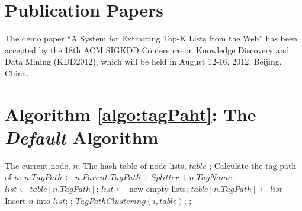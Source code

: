 \appendix{}
\chapter{Publication Papers}
The demo paper\cite{ZZX2012KDD} ``A System for Extracting Top-K Lists from the Web'' has been accepted by 
the 18th ACM SIGKDD Conference on Knowledge Discovery and Data Mining (KDD2012), which will be held in 
August 12-16, 2012, Beijing, China.


\chapter{Algorithm \ref{algo:tagPaht}: The {\em Default} Algorithm}
\label{appendix:algo}


\begin{algorithm}
\caption{$TagPathClustering(n,table)$}
\label{algo:tagPaht}
\begin{algorithmic}[1]
\REQUIRE
    The current node, $n$;
    The hash table of node lists, $table$ ;
\STATE  Calculate the tag path of $n$:
        $n.TagPath \gets n.Parent.TagPath+Splitter+n.TagName;$
        \STATE  $list \gets table[n.TagPath]$;
    \ELSE
        \STATE  $list \gets$ new empty lists;
        \STATE  $table[n.TagPath] \gets list$
    \ENDIF
    \STATE  Insert $n$ into $list$;
    \RETURN;
\ENDIF
{}
    \STATE $TagPathClustering(i,table)$;
\ENDFOR
\RETURN;

\end{algorithmic}
\end{algorithm}
